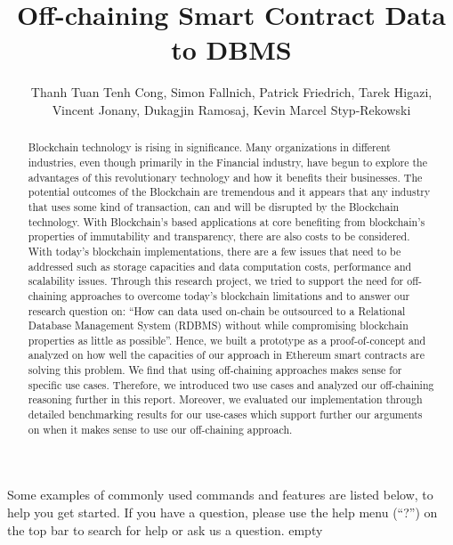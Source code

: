 \documentclass[a4paper]{article}
\title{Off-chaining Smart Contract Data to DBMS}
\author{Thanh Tuan Tenh Cong, 
Simon Fallnich,
Patrick Friedrich,
Tarek Higazi,\\
Vincent Jonany,
Dukagjin Ramosaj,
Kevin Marcel Styp-Rekowski}
\begin{document}
\maketitle

\begin{abstract}

Blockchain technology is rising in significance. Many organizations in different industries, even though primarily in the Financial industry, have begun to explore the advantages of this revolutionary technology and how it benefits their businesses. The potential outcomes of the Blockchain are tremendous and it appears that any industry that uses some kind of transaction, can and will be disrupted by the Blockchain technology. With Blockchain’s based applications at core benefiting from blockchain’s properties of immutability and transparency, there are also costs to be considered. With today’s blockchain implementations, there are a few issues that need to be addressed such as storage capacities and data computation costs, performance and scalability issues. Through this research project, we tried to support the need for off-chaining approaches to overcome today’s blockchain limitations and to answer our research question on: “How can data used on-chain be outsourced to a Relational Database Management System (RDBMS) without while compromising blockchain properties as little as possible”. Hence, we built a prototype as a proof-of-concept and analyzed on how well the capacities of our approach in Ethereum smart contracts are solving this problem. We find that using off-chaining approaches makes sense for specific use cases. Therefore, we introduced two use cases and analyzed our off-chaining reasoning further in this report. Moreover, we evaluated our implementation through detailed benchmarking results for our use-cases which support further our arguments on when it makes sense to use our off-chaining approach.


\end{abstract}
\newpage
\tableofcontents
\newpage












\newpage
Some examples of commonly used commands and features are listed below, to help you get started. If you have a question, please use the help menu (``?'') on the top bar to search for help or ask us a question. 
\newpage
empty
\newpage
\end{document}
